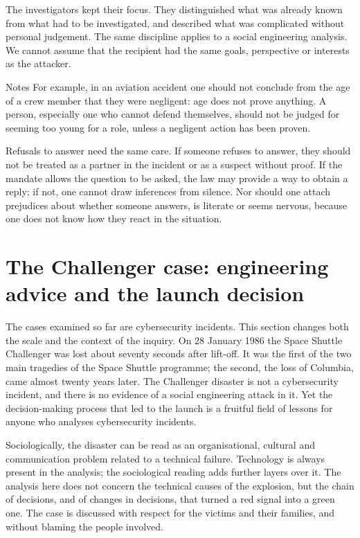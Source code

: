The investigators kept their focus. They distinguished what was already known from what had to be investigated, and described what was complicated without personal judgement. The same discipline applies to a social engineering analysis. We cannot assume that the recipient had the same goals, perspective or interests as the attacker.

\begin{nota}{Notes}
	For example, in an aviation accident one should not conclude from the age of a crew member that they were negligent: age does not prove anything. A person, especially one who cannot defend themselves, should not be judged for seeming too young for a role, unless a negligent action has been proven.
\end{nota}

Refusals to answer need the same care. If someone refuses to answer, they should not be treated as a partner in the incident or as a suspect without proof. If the mandate allows the question to be asked, the law may provide a way to obtain a reply; if not, one cannot draw inferences from silence. Nor should one attach prejudices about whether someone answers, is literate or seems nervous, because one does not know how they react in the situation.

\section{The Challenger case: engineering advice and the launch decision}

The cases examined so far are cybersecurity incidents. This section changes both the scale and the context of the inquiry. On 28 January 1986 the Space Shuttle Challenger was lost about seventy seconds after lift-off. It was the first of the two main tragedies of the Space Shuttle programme; the second, the loss of Columbia, came almost twenty years later. The Challenger disaster is not a cybersecurity incident, and there is no evidence of a social engineering attack in it. Yet the decision-making process that led to the launch is a fruitful field of lessons for anyone who analyses cybersecurity incidents.

Sociologically, the disaster can be read as an organisational, cultural and communication problem related to a technical failure. Technology is always present in the analysis; the sociological reading adds further layers over it. The analysis here does not concern the technical causes of the explosion, but the chain of decisions, and of changes in decisions, that turned a red signal into a green one. The case is discussed with respect for the victims and their families, and without blaming the people involved.

